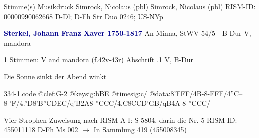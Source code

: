 \documentclass[twocolumn]{book}
\begin{document}
\newline \textcolor{darkblue}{}  Stimme(s)
\newline Musikdruck
\newline Simrock, Nicolaus  (pbl)
\newline Simrock, Nicolaus  (pbl)
\newline RISM-ID: 00000990062668
\newline D-Dl; D-Fh  Str Duo 0246; US-NYp
\newline \par \vspace{7pt} \textcolor{darkblue}{\textbf{Sterkel, Johann Franz Xaver  1750-1817}}
\newline An Minna, StWV 54/5 - B-Dur
\newline V, mandora
\newline \begin{itshape}\end{itshape} 
\newline \textcolor{darkblue}{}  1 Stimmen: V and mandora  (f.42v-43r)
\newline Abschrift
.1  V, B-Dur
\newline \begin{footnotesize} Die Sonne sinkt der Abend winkt \end{footnotesize}  
\begin{filecontents*}{334-1.code}
@clef:G-2
@keysig:bBE
@timesig:c/
@data:8'FFF/4B-8-FFF/4''C--8-'F/4.''D8'B{''CD}{EC}/q'B2A8-''CCC/4.C8C{CD}{'GB}/qB4A-8-''CCC/
\end{filecontents*}
\newline
%
\newline Vier Strophen
\newline Zuweisung nach RISM A I: S 5804, darin die Nr. 5
\newline RISM-ID: 455011118
\newline D-Fh  Ms 002
\newline $\rightarrow$ In Sammlung 419 (455008345)
      
\end{document}
